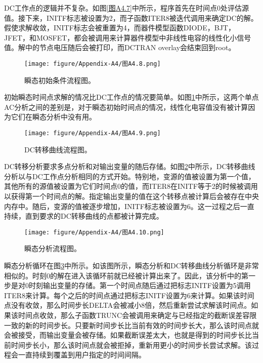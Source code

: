DC工作点的逻辑并不复杂。如图\ref{图A4.7}中所示，程序首先在时间点0处评估源值。接下来，INITF标志被设置为2，而子函数ITER8被迭代调用来确定DC的解。假使求解收敛，INITF标志会被重置为4，而器件模型函数DIODE，BJT，JFET，和MOSFET，都会被调用来计算器件模型中非线性电容的线性化小信号值。解中的节点电压随后会被打印，而DCTRAN overlay会结束回到root。

\begin{figure}[htbp]
\small
    \centering
    \texttt{[image: figure/Appendix-A4/图A4.8.png]}
    \caption{瞬态初始条件流程图。}
    \label{图A4.8}
\end{figure}

初始瞬态时间点求解的情况比DC工作点的情况要简单。如图\ref{图A4.8}中所示，这两个单点AC分析之间的差别是，对于瞬态初始时间点的情况，线性化电容值没有被计算因为它们在瞬态分析中没有用。

\begin{figure}[htbp]
\small
    \centering
    \texttt{[image: figure/Appendix-A4/图A4.9.png]}
    \caption{DC转移曲线流程图。}
    \label{图A4.9}
\end{figure}

DC转移分析要求多点分析和对输出变量的随后存储。如图\ref{图A4.9}中所示，DC转移曲线分析以与DC工作点分析相同的方式开始。特别地，变源的值被设置为第一个值，其他所有的源值被设置为它们时间点0的值，而ITER8在INITF等于2的时候被调用以获得第一个时间点的解。指定输出变量的值在这个转移点被计算后会被存在中央内存中。随后，变源的值被逐步增加，INITF标志被设置为6。这一过程之后一直持续，直到要求的DC转移曲线的点都被计算完成。

\begin{figure}[htbp]
\small
    \centering
    \texttt{[image: figure/Appendix-A4/图A4.10.png]}
    \caption{瞬态分析流程图。}
    \label{图A4.10}
\end{figure}

瞬态分析循环在图\ref{图A4.10}中所示。如该图所示，瞬态分析和DC转移曲线分析循环是非常相似的。时刻0的解在进入该循环前就已经被计算出来了。因此，该分析中的第一步是对0时刻输出变量的存储。第一个时间点随后通过把标志INITF设置为5调用ITER8来计算。每个之后的时间点通过把标志INITF设置为6来计算。如果该时间点没有收敛，那么时间步长DELTA会被减小8倍，然后重新尝试求解该时间点。如果该时间点收敛，那么子函数TRUNC会被调用来确定与已经指定的截断误差容限一致的新的时间步长。只要新时间步长比当前有效的时间步长大，那么该时间点就会被接受，而输出变量会被存储。如果截断误差太大，也就是得到的时间步长比当前时间步长小，那么该时间点就会被拒掉，重新用更小的时间步长尝试求解。该过程会一直持续到覆盖到用户指定的时间间隔。

